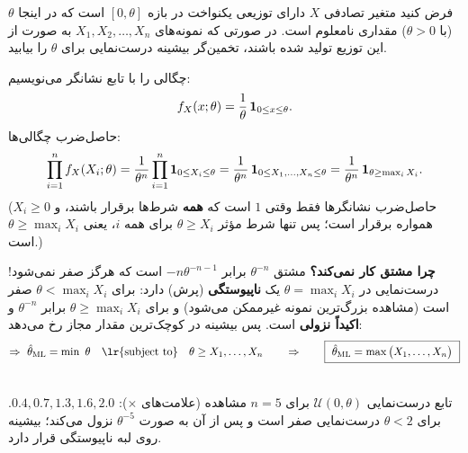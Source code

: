 \begin{example}
فرض کنید متغیر تصادفی $X$ دارای توزیعی یکنواخت در بازه $[0,\theta]$ است که در اینجا $\theta$ (با $\theta>0$) مقداری نامعلوم است. در صورتی که نمونه‌های $X_1,X_2,\ldots,X_n$ به صورت  از این توزیع تولید شده باشند، تخمین‌گر بیشینه درست‌نمایی برای $\theta$ را بیابید.
\begin{solution}
چگالی را با تابع نشانگر می‌نویسیم:
\[
f_X(x;\theta)=\frac1\theta\,\mathbf{1}_{0\le x\le\theta}.
\]
حاصل‌ضرب چگالی‌ها:
\[
\prod_{i=1}^nf_X(X_i;\theta)=\frac{1}{\theta^n}\prod_{i=1}^n\mathbf{1}_{0\le X_i\le\theta}=\frac{1}{\theta^n}\,\mathbf{1}_{0\le X_1,\ldots,X_n\le\theta}=\frac{1}{\theta^n}\,\mathbf{1}_{\theta\ge\max_iX_i}.
\]
(حاصل‌ضرب نشانگرها فقط وقتی $1$ است که \textbf{همه} شرط‌ها برقرار باشند، و $X_i\ge0$ همواره برقرار است؛ پس تنها شرط مؤثر $\theta\ge X_i$ برای همه $i$، یعنی $\theta\ge\max_iX_i$ است.)

\textbf{چرا مشتق کار نمی‌کند؟} مشتق $\theta^{-n}$ برابر $-n\theta^{-n-1}$ است که هرگز صفر نمی‌شود! درست‌نمایی در $\theta=\max_iX_i$ یک \textbf{ناپیوستگی} (پرش) دارد: برای $\theta<\max_iX_i$ صفر است (مشاهده بزرگ‌ترین نمونه غیرممکن می‌شود) و برای $\theta\ge\max_iX_i$ برابر $\theta^{-n}$ و \textbf{اکیداً نزولی} است. پس بیشینه در کوچک‌ترین مقدار مجاز رخ می‌دهد:
\[
\Rightarrow\ \hat\theta_\ML=\min\ \theta\quad\text{\lr{subject to}}\quad\theta\ge X_1,\ldots,X_n
\qquad\Rightarrow\qquad
\boxed{\ \hat\theta_\ML=\max\big(X_1,\ldots,X_n\big)\ }
\]
\end{solution}
\end{example}

\begin{center}
\\
{\small تابع درست‌نمایی $\mathcal U(0,\theta)$ برای $n=5$ مشاهده (علامت‌های $\times$): $0.4,0.7,1.3,1.6,2.0$. برای $\theta<2$ درست‌نمایی صفر است و پس از آن به صورت $\theta^{-5}$ نزول می‌کند؛ بیشینه روی لبه ناپیوستگی قرار دارد.}
\end{center}

